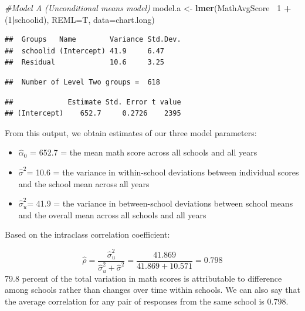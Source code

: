 \documentclass[
]{krantz}
\newenvironment{Shaded}{\begin{snugshade}}{\end{snugshade}}
\newcommand{\CommentTok}[1]{\textcolor[rgb]{0.37,0.37,0.37}{\textit{#1}}}
\newcommand{\DataTypeTok}[1]{\textcolor[rgb]{0.27,0.27,0.27}{#1}}
\newcommand{\DecValTok}[1]{\textcolor[rgb]{0.06,0.06,0.06}{#1}}
\newcommand{\KeywordTok}[1]{\textcolor[rgb]{0.27,0.27,0.27}{\textbf{#1}}}
\newcommand{\NormalTok}[1]{#1}
\newcommand{\OperatorTok}[1]{\textcolor[rgb]{0.43,0.43,0.43}{\textbf{#1}}}
\newcommand{\StringTok}[1]{\textcolor[rgb]{0.5,0.5,0.5}{#1}}
\begin{document}
\begin{Shaded}
\begin{Highlighting}[]
\CommentTok{#Model A (Unconditional means model)}
\NormalTok{model.a <-}\StringTok{ }\KeywordTok{lmer}\NormalTok{(MathAvgScore}\OperatorTok{~}\StringTok{ }\DecValTok{1} \OperatorTok{+}\StringTok{ }\NormalTok{(}\DecValTok{1}\OperatorTok{|}\NormalTok{schoolid), }
                \DataTypeTok{REML=}\NormalTok{T, }\DataTypeTok{data=}\NormalTok{chart.long)}
\end{Highlighting}
\end{Shaded}

\begin{verbatim}
##  Groups   Name        Variance Std.Dev.
##  schoolid (Intercept) 41.9     6.47    
##  Residual             10.6     3.25
\end{verbatim}

\begin{verbatim}
##  Number of Level Two groups =  618
\end{verbatim}

\begin{verbatim}
##             Estimate Std. Error t value
## (Intercept)    652.7     0.2726    2395
\end{verbatim}

From this output, we obtain estimates of our three model parameters:

\begin{itemize}
\item
  \(\hat{\alpha}_{0}\) = 652.7 = the mean math score across all schools and all years
\item
  \(\hat{\sigma}^2\)= 10.6 = the variance in within-school deviations between individual scores and the school mean across all years
\item
  \(\hat{\sigma}^2_u\)= 41.9 = the variance in between-school deviations between school means and the overall mean across all schools and all years
\end{itemize}

Based on the intraclass correlation coefficient:

\begin{equation*}
\hat{\rho}=\frac{\hat{\sigma}^2_u}{\hat{\sigma}^2_u + \hat{\sigma}^2} = \frac{41.869}{41.869+10.571}= 0.798
\end{equation*}
79.8 percent of the total variation in math scores is attributable to difference among schools rather than changes over time within schools. We can also say that the average correlation for any pair of responses from the same school is 0.798.
\end{document}
